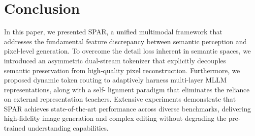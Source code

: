 \documentclass[runningheads]{llncs}
\begin{document}
\section{Conclusion}
In this paper, we presented SPAR, a unified multimodal framework that addresses the fundamental feature discrepancy between semantic perception and pixel-level generation. To overcome the detail loss inherent in semantic spaces, we introduced an asymmetric dual-stream tokenizer that explicitly decouples semantic preservation from high-quality pixel reconstruction. Furthermore, we proposed dynamic token routing to adaptively harness multi-layer MLLM representations, along with a self- lignment paradigm that eliminates the reliance on external representation teachers. Extensive experiments demonstrate that SPAR achieves state-of-the-art performance across diverse benchmarks, delivering high-fidelity image generation and complex editing without degrading the pre-trained understanding capabilities.
% 


%
%


\end{document}
